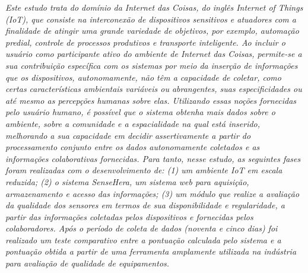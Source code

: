 \emph{
Este estudo trata do domínio da Internet das Coisas, do inglês \textit{Internet of Things} (IoT), que consiste na interconexão de dispositivos
 sensitivos e atuadores com a finalidade de atingir uma grande variedade de objetivos, por exemplo, automação predial, controle de processos produtivos e transporte inteligente. %
 Ao incluir o usuário como participante ativo do ambiente de Internet das Coisas,
 permite-se a sua contribuição específica com os sistemas por meio da inserção de informações que os
  dispositivos, autonomamente, não têm a capacidade de coletar,
 como certas características ambientais variáveis ou abrangentes, suas especificidades ou até
  mesmo as percepções humanas sobre elas.
  Utilizando essas noções fornecidas pelo usuário humano, é possível que o sistema obtenha mais
  dados sobre o ambiente, sobre a comunidade e a espacialidade na qual está inserido, melhorando
  a sua capacidade em decidir assertivamente a partir do processamento conjunto entre os dados autonomamente
  coletados e as informações colaborativas fornecidas.
  Para tanto, nesse estudo, as seguintes fases foram realizadas com o desenvolvimento de: (1) um ambiente IoT em escala reduzida;
  (2) o sistema SenseHera, um sistema web para aquisição, armazenamento e acesso das informações;
  (3) um módulo que realize a avaliação da qualidade dos sensores em termos de sua disponibilidade e regularidade, a partir das informações coletadas pelos dispositivos e fornecidas pelos colaboradores. Após o período de coleta de dados (noventa e cinco dias) foi realizado um teste comparativo entre a pontuação calculada pelo sistema e a pontuação obtida a partir de uma ferramenta amplamente utilizada na indústria para avaliação de qualidade de equipamentos.
}
